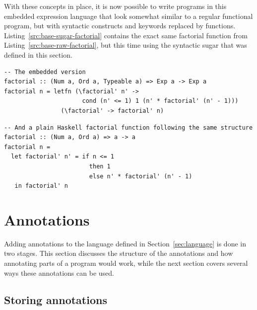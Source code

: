 \documentclass[fontsize=11pt,a4paper,parskip=half,numbers=noenddot]{scrartcl}
\begin{document}
With these concepts in place, it is now possible to write programs in this
embedded expression language that look somewhat similar to a regular functional
program, but with syntactic constructs and keywords replaced by functions.
Listing~\ref{src:base-sugar-factorial} contains the exact same factorial
function from Listing~\ref{src:base-raw-factorial}, but this time using the
syntactic sugar that was defined in this section.

\begin{listing}[!ht]
\begin{verbatim}
-- The embedded version
factorial :: (Num a, Ord a, Typeable a) => Exp a -> Exp a
factorial n = letfn (\factorial' n' ->
                      cond (n' <= 1) 1 (n' * factorial' (n' - 1)))
                (\factorial' -> factorial' n)
\end{verbatim}

\begin{verbatim}
-- And a plain Haskell factorial function following the same structure
factorial :: (Num a, Ord a) => a -> a
factorial n =
  let factorial' n' = if n <= 1
                        then 1
                        else n' * factorial' (n' - 1)
   in factorial' n
\end{verbatim}
\caption{The recursive factorial implementation from Listing~\ref{src:base-raw-factorial} implemented using the smart constructors defined above, as well as a plain Haskell equivalent of the same program.}\label{src:base-sugar-factorial}
\end{listing}

\section{Annotations}\label{sec:annotations}


Adding annotations to the language defined in Section~\ref{sec:language} is done
in two stages. This section discusses the structure of the annotations and how
annotating parts of a program would work, while the next section covers several
ways these annotations can be used.

\subsection{Storing annotations}
\end{document}
